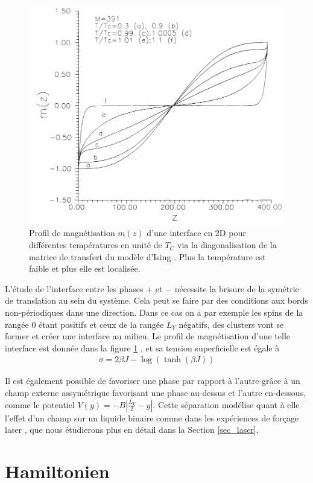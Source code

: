 \begin{figure}
    \centering
    \includegraphics[width=0.5\linewidth]{isingtosos/stecki-profil.png}
    \caption{Profil de magnétisation $m(z)$ d'une interface en 2D pour différentes températures en unité de $T_C$ via la diagonalisation de la matrice de transfert du modèle d'Ising \cite{stecki_magnetization_1994}. Plus la température est faible  et plus elle est localisée.}
    \label{interface-ising}
\end{figure}

L'étude de l'interface entre les phases $+$ et $-$ nécessite la brisure de la symétrie de translation au sein du système. Cela peut se faire par des conditions aux bords non-périodiques dans une direction.
Dans ce cas on a par exemple les spins de la rangée $0$ étant positifs et ceux de la rangée $L_Y$ négatifs, des clusters vont se former et créer une interface au milieu. 
Le profil de magnétisation d'une telle interface est donnée dans la figure \ref{interface-ising} \cite{stecki_magnetization_1994}, et sa tension superficielle est égale à \cite{abraham_transfer_1973,abraham_interface_1976.richards_numerical_1993} 
\begin{align}
    \sigma = 2 \beta J - \log(\tanh(\beta J))
\end{align}

Il est également possible de favoriser une phase par rapport à l'autre grâce à un champ externe assymétrique favorisant une phase au-dessus et l'autre en-dessous, comme le potentiel $V(y) = - B |\frac{L_Y}{2}-y|$. Cette séparation modélise quant à elle l'effet d'un champ  sur un liquide binaire comme dans les expériences de forçage laser \cite{girot_conical_2019}, que nous étudierons plus en détail dans la Section \ref{sec_laser}.

    \section{Hamiltonien}
	
